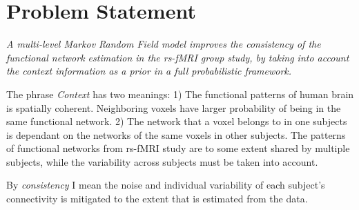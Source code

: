 \documentclass[12pt]{article}
\begin{document}
\section{Problem Statement}



\begin{center}
\parbox{5in}{\emph{A multi-level Markov Random Field model improves the
    consistency of the functional network estimation in the rs-fMRI group study,
    by taking into account the context information as a prior in a full
    probabilistic framework. }}
\end{center}

\noindent The phrase \emph{Context} has two meanings: 1) The functional patterns
of human brain is spatially coherent. Neighboring voxels have larger probability
of being in the same functional network. 2) The network that a voxel belongs to
in one subjects is dependant on the networks of the same voxels in other
subjects. The patterns of functional networks from rs-fMRI study are to some
extent shared by multiple subjects, while the variability across subjects must
be taken into account.

By \emph{consistency} I mean the noise and individual variability of each
subject's connectivity is mitigated to the extent that is estimated from the
data.
\end{document}

